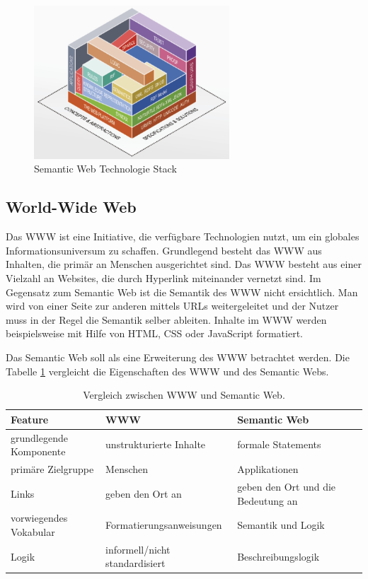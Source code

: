 \begin{figure}[h]
	\centering
    	\includegraphics[width=0.65\textwidth]{Images/Linked_Data_Tech_Stack}
   	\caption{Semantic Web Technologie Stack}
   	\label{fig:abb1}
\end{figure}

\subsection{World-Wide Web}

Das \ac{WWW} ist eine Initiative, die verfügbare Technologien nutzt, um ein globales Informationsuniversum zu schaffen.
Grundlegend besteht das \ac{WWW} aus Inhalten, die primär an Menschen ausgerichtet sind.
Das \ac{WWW} besteht aus einer Vielzahl an Websites, die durch Hyperlink miteinander vernetzt sind.
Im Gegensatz zum Semantic Web ist die Semantik des \ac{WWW} nicht ersichtlich.
Man wird von einer Seite zur anderen mittels \ac{URL}s weitergeleitet und der Nutzer muss in der Regel die Semantik selber ableiten.
Inhalte im \ac{WWW} werden beispielsweise mit Hilfe von HTML, CSS oder JavaScript formatiert.

Das Semantic Web soll als eine Erweiterung des WWW betrachtet werden.
Die Tabelle \ref{table:1} vergleicht die Eigenschaften des \ac{WWW} und des Semantic Webs.

\begin{table}[h]
\begin{center}
\begin{tabular}{ | p{3 cm} | p{4 cm} | p{4 cm} | }
\hline
\textbf{Feature} & \textbf{WWW} & \textbf{Semantic Web} \\
\hline
grundlegende Komponente & unstrukturierte Inhalte & formale Statements \\ 
\hline
primäre Zielgruppe & Menschen & Applikationen \\ 
\hline
Links & geben den Ort an & geben den Ort und die Bedeutung an \\ 
\hline
vorwiegendes Vokabular & Formatierungsanweisungen & Semantik und Logik \\ 
\hline
Logik & informell/nicht standardisiert & Beschreibungslogik \\ 
\hline
\end{tabular}
\caption{Vergleich zwischen WWW und Semantic Web.}
\label{table:1}
\end{center}
\end{table}


